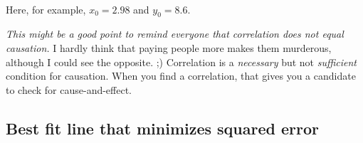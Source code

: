 \begin{fullwidth}
\\

\noindent Here, for example, $x_0 = 2.98$ and $y_0 = 8.6$.

{\em This might be a good point to remind everyone that correlation does not equal causation.}  I hardly think that paying people more makes them murderous, although I could see the opposite. ;)  Correlation is a {\em necessary} but not {\em sufficient} condition for causation. When you find a correlation, that gives you a candidate to check for cause-and-effect.

\subsection{Best fit line that minimizes squared error}


\end{fullwidth}

